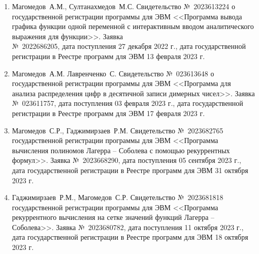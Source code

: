 \begin{enumerate}

    \item Магомедов~А.М., Султанахмедов~М.С. Свидетельство №~2023613224 о государственной регистрации программы для ЭВМ <<Программа вывода графика функции одной переменной с интерактивным вводом аналитического выражения для функции>>. Заявка \\№~2022686205, дата поступления 27 декабря 2022 г., дата государственной регистрации в Реестре программ для ЭВМ 13 февраля 2023 г. 

    \item Магомедов~А.М. Лавренченко~С. Свидетельство №~023613648 о государственной регистрации программы для ЭВМ <<Программа для анализа распределения цифр в десятичной записи димерных чисел>>. Заявка №~023611757, дата поступления 03 февраля 2023 г., дата государственной регистрации в Реестре программ для ЭВМ 17 февраля 2023 г. 
    
    \item
    {Магомедов~С.Р., Гаджимирзаев~Р.М.} 
    Свидетельство №~2023682765 государственной регистрации программы для ЭВМ <<Программа вычисления полиномов Лагерра -- Соболева с помощью рекуррентных формул>>. Заявка №~2023668290, дата поступления 05 сентября 2023 г., дата государственной регистрации в Реестре программ для ЭВМ 31 октября 2023 г.

    \item
    {Гаджимирзаев~Р.М., Магомедов~С.Р.} 
    Свидетельство №~2023681818 государственной регистрации программы для ЭВМ <<Программа рекуррентного вычисления на сетке значений функций Лагерра -- Соболева>>. Заявка №~2023680782, дата поступления 11 октября 2023 г., дата государственной регистрации в Реестре программ для ЭВМ 18 октября 2023 г.

\end{enumerate}

